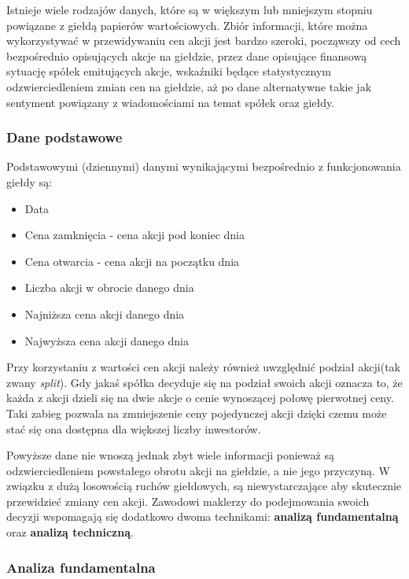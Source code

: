 \documentclass[a4paper, twoside, 11pt, openright]{article}
\begin{document}
Istnieje wiele rodzajów danych, które są w większym lub mniejszym stopniu powiązane z giełdą papierów wartościowych. Zbiór informacji, które można wykorzystywać w przewidywaniu cen akcji jest bardzo szeroki, począwszy od cech bezpośrednio opisujących akcje na giełdzie, przez dane opisujące finansową sytuację spółek emitujących akcje, wskaźniki będące statystycznym odzwierciedleniem zmian cen na giełdzie, aż po dane alternatywne takie jak sentyment powiązany z wiadomościami na temat spółek oraz giełdy.

\subsubsection{Dane podstawowe}

Podstawowymi (dziennymi) danymi wynikającymi bezpośrednio z funkcjonowania giełdy są:

\begin{itemize}
\item{Data}
\item{Cena zamknięcia} - cena akcji pod koniec dnia
\item{Cena otwarcia} - cena akcji na początku dnia
\item{Liczba akcji w obrocie danego dnia}
\item{Najniższa cena akcji danego dnia}
\item{Najwyższa cena akcji danego dnia}
\end{itemize}

 Przy korzystaniu z wartości cen akcji należy również uwzględnić podział akcji(tak zwany \textit{split}). Gdy jakaś spółka decyduje się na podział swoich akcji oznacza to, że każda z akcji dzieli się na dwie akcje o cenie wynoszącej połowę pierwotnej ceny. Taki zabieg pozwala na zmniejszenie ceny pojedynczej akcji dzięki czemu może stać się ona dostępna dla większej liczby inwestorów. 
 
\bigskip

Powyższe dane nie wnoszą jednak zbyt wiele informacji ponieważ są odzwierciedleniem powstałego obrotu akcji na giełdzie, a nie jego przyczyną. W związku z dużą losowością ruchów giełdowych, są niewystarczające aby skutecznie przewidzieć zmiany cen akcji. Zawodowi maklerzy do podejmowania swoich decyzji wspomagają się dodatkowo dwoma technikami: \textbf{analizą fundamentalną} oraz \textbf{analizą techniczną}.

\subsubsection{Analiza fundamentalna \cite{fundamentalanalysis}}
\end{document}
